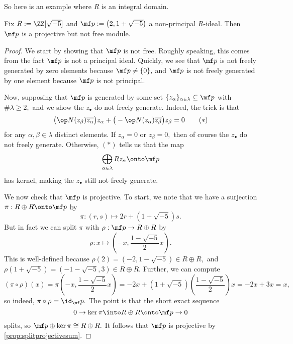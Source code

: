 \documentclass[../notes.tex]{subfiles}
\begin{document}
So here is an example where $R$ is an integral domain.
\begin{exercise}
	Fix $R:=\ZZ[\sqrt{-5}]$ and $\mf p:=\left(2,1+\sqrt{-5}\right)$ a non-principal $R$-ideal. Then $\mf p$ is a projective but not free module.
\end{exercise}
\begin{proof}
	We start by showing that $\mf p$ is not free. Roughly speaking, this comes from the fact $\mf p$ is not a principal ideal. Quickly, we see that $\mf p$ is not freely generated by zero elements because $\mf p\ne\{0\},$ and $\mf p$ is not freely generated by one element because $\mf p$ is not principal.
	
	Now, supposing that $\mf p$ is generated by some set $\{z_\alpha\}_{\alpha\in\lambda}\subseteq\mf p$ with $\#\lambda\ge2,$ and we show the $z_\bullet$ do not freely generate. Indeed, the trick is that
	\[\big(\op N(z_\beta)\overline{z_\alpha}\big)z_\alpha+\big(-\op N(z_\alpha)\overline{z_\beta}\big)z_\beta=0\tag{$*$}\]
	for any $\alpha,\beta\in\lambda$ distinct elements. If $z_\alpha=0$ or $z_\beta=0,$ then of course the $z_\bullet$ do not freely generate. Otherwise, $(*)$ tells us that the map
	\[\bigoplus_{\alpha\in\lambda}Rz_\alpha\onto\mf p\]
	has kernel, making the $z_\bullet$ still not freely generate.

	We now check that $\mf p$ is projective. To start, we note that we have a surjection $\pi:R\oplus R\onto\mf p$ by
	\[\pi:(r,s)\mapsto2r+\left(1+\sqrt{-5}\right)s.\]
	But in fact we can split $\pi$ with $\rho:\mf p\to R\oplus R$ by
	\[\rho:x\mapsto\left(-x,\frac{1-\sqrt{-5}}2x\right).\]
	This is well-defined because $\rho(2)=\left(-2,1-\sqrt{-5}\right)\in R\oplus R,$ and $\rho\left(1+\sqrt{-5}\right)=\left(-1-\sqrt{-5},3\right)\in R\oplus R.$ Further, we can compute
	\[(\pi\circ\rho)(x)=\pi\left(-x,\frac{1-\sqrt{-5}}2x\right)=-2x+\left(1+\sqrt{-5}\right)\left(\frac{1-\sqrt{-5}}2\right)x=-2x+3x=x,\]
	so indeed, $\pi\circ\rho=\id_\mf p.$ The point is that the short exact sequence
	\[0\to\ker\pi\into R\oplus R\onto\mf p\to 0\]
	splits, so $\mf p\oplus\ker\pi\cong R\oplus R.$ It follows that $\mf p$ is projective by \autoref{prop:splitprojectivesum}.
\end{proof}
\end{document}
